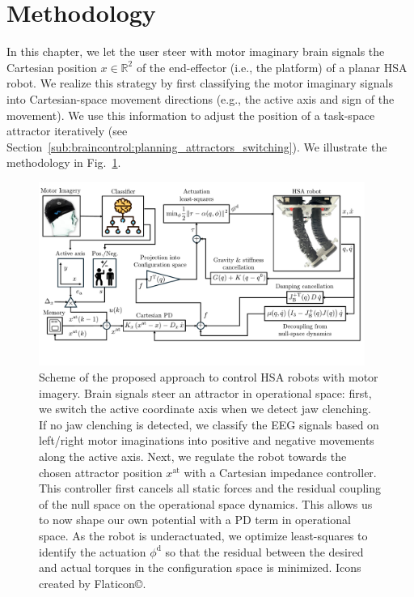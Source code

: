 \section{Methodology}
In this chapter, we let the user steer with motor imaginary brain signals the Cartesian position $x \in \mathbb{R}^2$ of the end-effector (i.e., the platform) of a planar \gls{HSA} robot.
We realize this strategy by first classifying the motor imaginary signals into Cartesian-space movement directions (e.g., the active axis and sign of the movement). We use this information to adjust the position of a task-space attractor iteratively (see Section~\ref{sub:braincontrol:planning_attractors_switching}). %
We illustrate the methodology in Fig.~\ref{fig:braincontrol:control_scheme}.

\begin{figure}
    \centering
    \includegraphics[width=0.95\textwidth]{braincontrol/figures/control_scheme/control_scheme_v2_cropped.pdf}
    \caption{Scheme of the proposed approach to control HSA robots with motor imagery. Brain signals steer an attractor in operational space: first, we switch the active coordinate axis when we detect jaw clenching. If no jaw clenching is detected, we classify the EEG signals based on left/right motor imaginations into positive and negative movements along the active axis. Next, we regulate the robot towards the chosen attractor position $x^\mathrm{at}$ with a Cartesian impedance controller. This controller first cancels all static forces and the residual coupling of the null space on the operational space dynamics. This allows us to now shape our own potential with a PD term in operational space. As the robot is underactuated, we optimize least-squares to identify the actuation $\phi^\mathrm{d}$ so that the residual between the desired and actual torques in the configuration space is minimized. Icons created by Flaticon\copyright.}
    \label{fig:braincontrol:control_scheme}
\end{figure}

